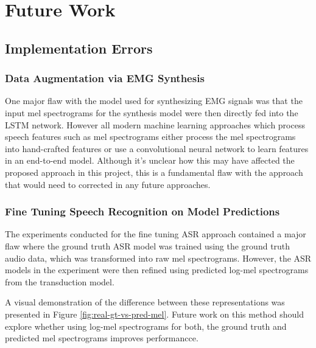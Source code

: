 \chapter{Future Work} \label{chap:future-work}

\section{Implementation Errors}

\subsection{Data Augmentation via EMG Synthesis}

One major flaw with the model used for synthesizing EMG signals
was that the input mel spectrograms for the synthesis model were
then directly fed into the LSTM network. However all modern
machine learning approaches which process speech features such as
mel spectrograms either process the mel spectrograms into hand-crafted
features or use a convolutional neural network to learn features
in an end-to-end model. Although it's unclear how this may have affected
the proposed approach in this project, this is a fundamental flaw with
the approach that would need to corrected in any future approaches.

\subsection{Fine Tuning Speech Recognition on Model Predictions}

The experiments conducted for the fine tuning ASR approach contained
a major flaw where the ground truth ASR model was trained using
the ground truth audio data, which was transformed into raw mel spectrograms.
However, the ASR models in the experiment were then
refined using predicted log-mel spectrograms from the transduction model.

A visual demonstration of the difference between these representations
was presented in Figure \ref{fig:real-gt-vs-pred-mel}. Future work
on this method should explore whether using log-mel spectrograms for
both, the ground truth and predicted mel spectrograms improves performancce.